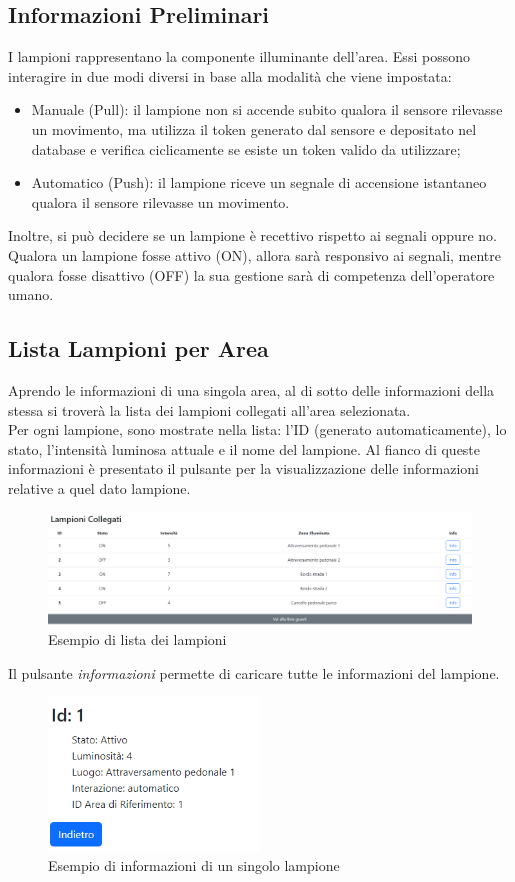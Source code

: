 \documentclass[a4paper, 12pt]{article}
\begin{document}
\subsection{Informazioni Preliminari}
I lampioni rappresentano la componente illuminante dell'area. Essi possono interagire in due modi diversi in base alla modalità che viene impostata:
\begin{itemize}
    \item Manuale (Pull): il lampione non si accende subito qualora il sensore rilevasse un movimento, ma utilizza il token generato dal sensore e depositato nel database e verifica ciclicamente se esiste un token valido da utilizzare;
    \item Automatico (Push): il lampione riceve un segnale di accensione istantaneo qualora il sensore rilevasse un movimento.
\end{itemize}
Inoltre, si può decidere se un lampione è recettivo rispetto ai segnali oppure no. Qualora un lampione fosse attivo (ON), allora sarà responsivo ai segnali, mentre qualora fosse disattivo (OFF) la sua gestione sarà di competenza dell'operatore umano.
\subsection{Lista Lampioni per Area}
Aprendo le informazioni di una singola area, al di sotto delle informazioni della stessa si troverà la lista dei lampioni collegati all'area selezionata.\\
Per ogni lampione, sono mostrate nella lista: l'ID (generato automaticamente), lo stato, l'intensità luminosa attuale e il nome del lampione. Al fianco di queste informazioni è presentato il pulsante per la visualizzazione delle informazioni relative a quel dato lampione.\\
\begin{figure}[H]
    \centering
    \includegraphics[width=\textwidth]{ListaLampioni}
    \caption{Esempio di lista dei lampioni}
\end{figure}
Il pulsante \textit{informazioni} permette di caricare tutte le informazioni del lampione.\\
\begin{figure}[H]
    \centering
    \includegraphics[width=0.5\textwidth]{InfoLampione}
    \caption{Esempio di informazioni di un singolo lampione}
\end{figure}
\end{document}
